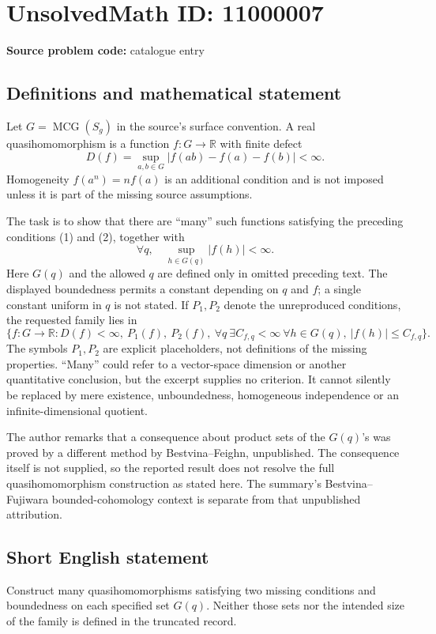 \documentclass[11pt]{article}
\newcommand{\R}{\mathbb{R}}
\begin{document}
\section*{UnsolvedMath ID: 11000007}
\textbf{Source problem code:} catalogue entry
\subsection{Definitions and mathematical statement}
Let \(G=\operatorname{MCG}(S_g)\) in the source's surface convention. A real quasihomomorphism is a function \(f:G\to\R\) with finite defect
\[D(f)=\sup_{a,b\in G}|f(ab)-f(a)-f(b)|<\infty.\]
Homogeneity \(f(a^n)=nf(a)\) is an additional condition and is not imposed unless it is part of the missing source assumptions.

The task is to show that there are ``many'' such functions satisfying the preceding conditions (1) and (2), together with
\[\forall q,\quad\sup_{h\in G(q)}|f(h)|<\infty.\tag{3}\]
Here \(G(q)\) and the allowed \(q\) are defined only in omitted preceding text. The displayed boundedness permits a constant depending on \(q\) and \(f\); a single constant uniform in \(q\) is not stated. If \(P_1,P_2\) denote the unreproduced conditions, the requested family lies in
\[\{f:G\to\R:D(f)<\infty,\ P_1(f),\ P_2(f),\ \forall q\ \exists C_{f,q}<\infty\ \forall h\in G(q),\ |f(h)|\leq C_{f,q}\}.\]
The symbols \(P_1,P_2\) are explicit placeholders, not definitions of the missing properties. ``Many'' could refer to a vector-space dimension or another quantitative conclusion, but the excerpt supplies no criterion. It cannot silently be replaced by mere existence, unboundedness, homogeneous independence or an infinite-dimensional quotient.

The author remarks that a consequence about product sets of the \(G(q)\)'s was proved by a different method by Bestvina--Feighn, unpublished. The consequence itself is not supplied, so the reported result does not resolve the full quasihomomorphism construction as stated here. The summary's Bestvina--Fujiwara bounded-cohomology context is separate from that unpublished attribution.
\subsection{Short English statement}
Construct many quasihomomorphisms satisfying two missing conditions and boundedness on each specified set \(G(q)\). Neither those sets nor the intended size of the family is defined in the truncated record.
\end{document}
